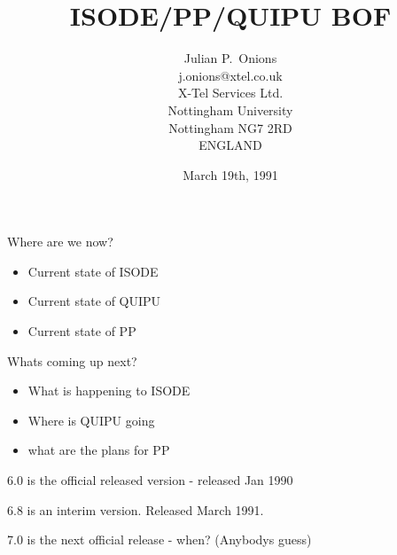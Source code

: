 

\raggedright


\title	{ISODE/PP/QUIPU BOF}

\author{Julian P.~Onions\\
j.onions@xtel.co.uk\\[.5in]
X-Tel Services Ltd.\\
Nottingham University\\
Nottingham NG7 2RD\\
ENGLAND}

\date	{March 19th, 1991}

\maketitle

\begin{bwslide}
\begin{nrtc}
\item	Where are we now?
	\begin{itemize}
	\item	Current state of ISODE
	\item	Current state of QUIPU
	\item	Current state of PP
	\end{itemize}

\item	Whats coming up next?
	\begin{itemize}
	\item	What is happening to ISODE
	\item	Where is QUIPU going
	\item	what are the plans for PP
	\end{itemize}
\end{nrtc}
\end{bwslide}

\begin{bwslide}
\begin{nrtc}
\item	6.0 is the official released version - released Jan 1990
\item	6.8 is an interim version. Released March 1991.
\item	7.0 is the next official release - when? (Anybodys guess)
\end{nrtc}
\end{bwslide}

